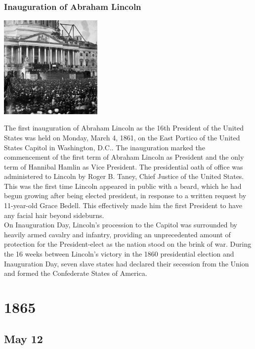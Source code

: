 \documentclass[11pt]{report}
\begin{document}
\subsection{Inauguration of Abraham Lincoln}
\vspace{2mm}\begin{center}\includegraphics[width=5cm]{./img/inaugLincoln.jpg}\end{center}
The first inauguration of Abraham Lincoln as the 16th President of the United States was held on Monday, March 4, 1861, on the East Portico of the United States Capitol in Washington, D.C.. The inauguration marked the commencement of the first term of Abraham Lincoln as President and the only term of Hannibal Hamlin as Vice President. The presidential oath of office was administered to Lincoln by Roger B. Taney, Chief Justice of the United States.\\
This was the first time Lincoln appeared in public with a beard, which he had begun growing after being elected president, in response to a written request by 11-year-old Grace Bedell. This effectively made him the first President to have any facial hair beyond sideburns.\\
On Inauguration Day, Lincoln's procession to the Capitol was surrounded by heavily armed cavalry and infantry, providing an unprecedented amount of protection for the President-elect as the nation stood on the brink of war. During the 16 weeks between Lincoln's victory in the 1860 presidential election and Inauguration Day, seven slave states had declared their secession from the Union and formed the Confederate States of America.

\chapter{1865}
\section{May 12}
\end{document}
